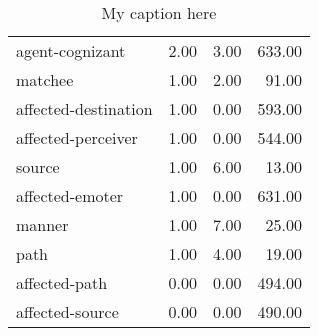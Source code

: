 \begin{table}[!ht]
\begin{tabular}{lrrr}
agent-cognizant      &     2.00 &                3.00 &              633.00 \\
matchee              &     1.00 &                2.00 &               91.00 \\
affected-destination &     1.00 &                0.00 &              593.00 \\
affected-perceiver   &     1.00 &                0.00 &              544.00 \\
source               &     1.00 &                6.00 &               13.00 \\
affected-emoter      &     1.00 &                0.00 &              631.00 \\
manner               &     1.00 &                7.00 &               25.00 \\
path                 &     1.00 &                4.00 &               19.00 \\
affected-path        &     0.00 &                0.00 &              494.00 \\
affected-source      &     0.00 &                0.00 &              490.00 \\
\bottomrule
\end{tabular}
\caption{My caption here}
\label{tab:PARTICIPANT_ROLE-oe-data}
\end{table}